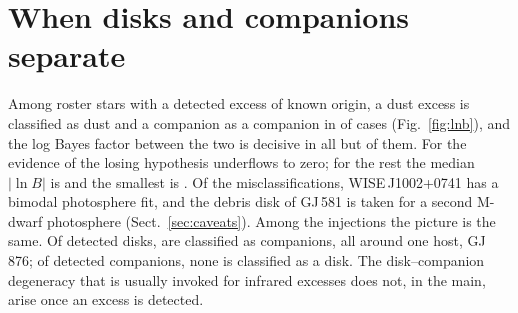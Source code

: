 \documentclass{aa}
\begin{document}
\begin{table}
\caption{Classification outcome by category (main-sequence branch).}
\label{tab:bycat}
\centering
\setlength{\tabcolsep}{4pt}

\end{table}

\section{When disks and companions separate}
\label{sec:separate}

Among roster stars with a detected excess of known origin, a dust excess is
classified as dust and a companion as a companion in \rosDCok{} of \rosDC{} cases
(Fig.~\ref{fig:lnb}), and the log Bayes factor between the two is decisive in all
but \rosDCweak{} of them. For \rosDCinf{} the evidence of the losing hypothesis underflows to zero;
for the rest the median $|\ln B|$ is \rosDClnbMed{} and the smallest is \rosDClnbMin. Of the
\rosDCwrong{} misclassifications, WISE\,J1002+0741 has a bimodal photosphere fit, and the
debris disk of GJ\,581 is taken for a second M-dwarf photosphere
(Sect.~\ref{sec:caveats}). Among the injections
the picture is the same. Of \injDiskDet{} detected disks, \injDiskAsCompDet{} are classified as companions,
all around one host, GJ\,876; of \injCompDet{} detected companions, none is classified
as a disk. The disk--companion degeneracy that is usually invoked for infrared
excesses does not, in the main, arise once an excess is detected.
\end{document}
